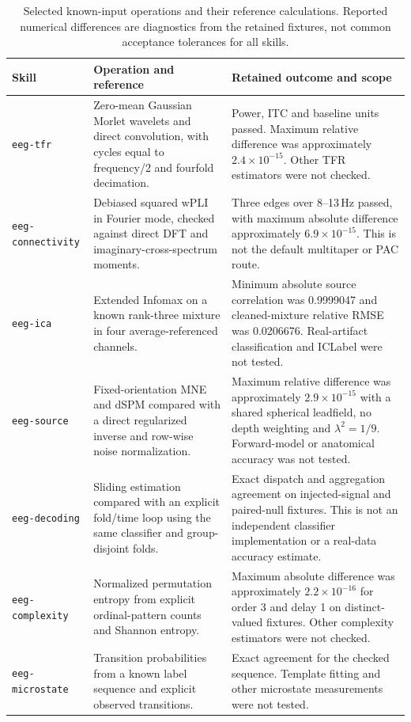 \begin{table}[htbp]
\centering\small
\caption{Selected known-input operations and their reference calculations. Reported numerical differences are diagnostics from the retained fixtures, not common acceptance tolerances for all skills.}
\label{tab:operations}
\begin{tabularx}{\linewidth}{@{}l X X@{}}
\toprule
Skill & Operation and reference & Retained outcome and scope\\
\midrule
\texttt{eeg-tfr} & Zero-mean Gaussian Morlet wavelets and direct convolution, with cycles equal to frequency/2 and fourfold decimation. & Power, ITC and baseline units passed. Maximum relative difference was approximately $2.4\times10^{-15}$. Other TFR estimators were not checked.\\
\texttt{eeg-connectivity} & Debiased squared wPLI in Fourier mode, checked against direct DFT and imaginary-cross-spectrum moments. & Three edges over 8--13\,Hz passed, with maximum absolute difference approximately $6.9\times10^{-15}$. This is not the default multitaper or PAC route.\\
\texttt{eeg-ica} & Extended Infomax on a known rank-three mixture in four average-referenced channels. & Minimum absolute source correlation was 0.9999047 and cleaned-mixture relative RMSE was 0.0206676. Real-artifact classification and ICLabel were not tested.\\
\texttt{eeg-source} & Fixed-orientation MNE and dSPM compared with a direct regularized inverse and row-wise noise normalization. & Maximum relative difference was approximately $2.9\times10^{-15}$ with a shared spherical leadfield, no depth weighting and $\lambda^2=1/9$. Forward-model or anatomical accuracy was not tested.\\
\texttt{eeg-decoding} & Sliding estimation compared with an explicit fold/time loop using the same classifier and group-disjoint folds. & Exact dispatch and aggregation agreement on injected-signal and paired-null fixtures. This is not an independent classifier implementation or a real-data accuracy estimate.\\
\texttt{eeg-complexity} & Normalized permutation entropy from explicit ordinal-pattern counts and Shannon entropy. & Maximum absolute difference was approximately $2.2\times10^{-16}$ for order 3 and delay 1 on distinct-valued fixtures. Other complexity estimators were not checked.\\
\texttt{eeg-microstate} & Transition probabilities from a known label sequence and explicit observed transitions. & Exact agreement for the checked sequence. Template fitting and other microstate measurements were not tested.\\

\end{tabularx}
\end{table}
